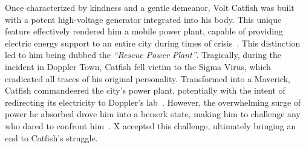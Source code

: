 Once characterized by kindness and a gentle demeanor, Volt Catfish was built with a potent high-voltage generator integrated into his body. This unique feature effectively rendered him a mobile power plant, capable of providing electric energy support to an entire city during times of crisis~\cite{wayback:X3_resources}. This distinction led to him being dubbed the \textit{``Rescue Power Plant''}. Tragically, during the incident in Doppler Town, Catfish fell victim to the Sigma Virus, which eradicated all traces of his original personality. Transformed into a Maverick, Catfish commandeered the city's power plant, potentially with the intent of redirecting its electricity to Doppler's lab~\cite{wiki:Volt_catfish}. However, the overwhelming surge of power he absorbed drove him into a berserk state, making him to challenge any who dared to confront him~\cite{Xcoll1:Manual_X3}. X accepted this challenge, ultimately bringing an end to Catfish's struggle.

